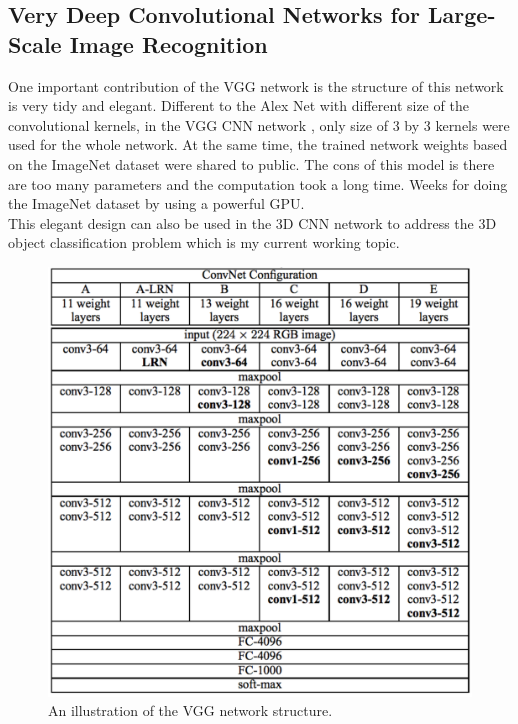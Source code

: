 \documentclass[a4paper,12pt]{article}
\begin{document}
\subsection{Very Deep Convolutional Networks for Large-Scale Image Recognition\cite{SimonyanZ14a}}
One important contribution of the VGG network is the structure of this network is very tidy and elegant. Different to the Alex  Net\cite{NIPS2012_4824} with different size of the convolutional kernels, in the VGG CNN network\cite{SimonyanZ14a} , only size of 3 by 3 kernels were used for the whole network. At the same time, the trained network weights based on the ImageNet\cite{imagenet_cvpr09} dataset were shared to public. The cons of this model is there are too many parameters and the computation took a long time. Weeks for doing the ImageNet\cite{imagenet_cvpr09}  dataset by using a powerful GPU. \\
This elegant design can also be used in the 3D CNN network to address the 3D object classification problem which is my current working topic.\\
 \begin{figure}[H]
  \begin{center}
      \includegraphics[scale=0.75]{vgg16.png}
\end{center}
\caption{An illustration of the VGG network structure.}
 \label{fig:vgg16}
 \end{figure}
\end{document}
